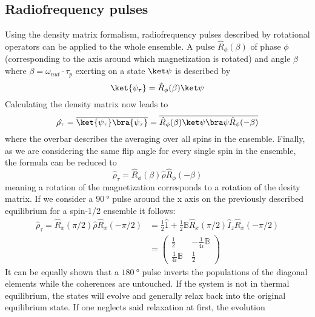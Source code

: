		\subsection{Radiofrequency pulses}
		Using the density matrix formalism, radiofrequency pulses described by rotational operators can be
		applied to the whole ensemble. A pulse $\hat R_\phi(\beta)$ of phase $\phi$ (corresponding
		to the axis around which magnetization is rotated) and angle $\beta$ where
		$\beta=\omega_{nut} \cdot \tau_p$ exerting on a state $\ket\psi$ is described by 
		\begin{equation}
			\ket{\psi_\tau}= \hat R_\phi(\beta)\ket\psi
		\end{equation}
		Calculating the density matrix now leads to
		\begin{equation}
			\hat {\rho_\tau} = \overline{\ket{\psi_\tau}\bra{\psi_\tau}} = \overline{\hat
				R_{\phi}(\beta)\ket\psi\bra\psi \hat R_\phi(-\beta)}
		\end{equation}
		where the overbar describes the averaging over all spins in the ensemble.
		Finally, as we are considering the same flip angle for every single spin in the ensemble,
		the formula can be reduced to
		\begin{equation}
			\hat\rho_\tau = \hat R_\phi(\beta) \hat \rho \hat R_\phi(-\beta)
		\end{equation}
		meaning a rotation of the magnetization corresponds to a rotation of the desity matrix.
		If we consider a $\SI{90}{\degree}$ pulse around the x axis on the previously described
		equilibrium for a spin-1/2 ensemble it follows:
		\begin{equation}
			\begin{split}
				\hat\rho_\tau = \hat R_x(\pi/2)\hat\rho\hat R_x(-\pi/2) &= \frac{1}{2} \hat 1 +
				\frac{1}{2} \mathbb{B}\hat R_x(\pi/2) \hat I_z \hat R_x(-\pi/2)\\
				&=
				\begin{pmatrix}
					\frac{1}{2} & -\frac{1}{4i}\mathbb{B}\\
					\frac{1}{4i}\mathbb{B}\ & \frac{1}{2}
				\end{pmatrix}
			\end{split}
		\end{equation}
		It can be equally shown that a $\SI{180}{\degree}$ pulse inverts the populations of the
		diagonal elements while the coherences are untouched.
		If the system is not in thermal equilibrium, the states will evolve and generally relax back
		into the original equilibrium state. If one neglects said relaxation at first, the evolution
